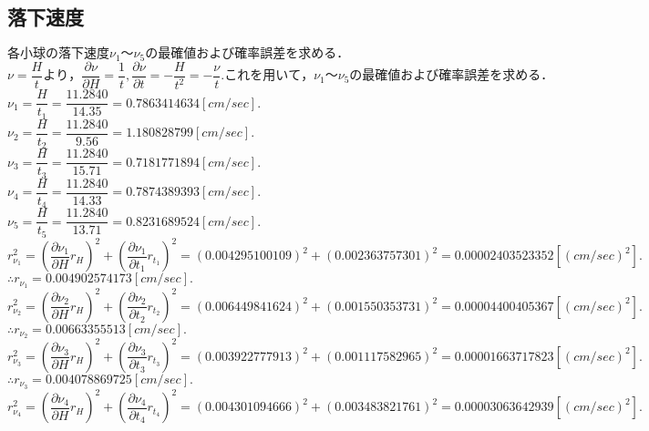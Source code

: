 \documentclass[a4paper,1pt]{jsarticle}
\begin{document}
\subsection*{落下速度}
$各小球の落下速度\nu _1〜\nu _5の最確値および確率誤差を求める．$\\

$\nu =\dfrac{H}{t}より，\dfrac{\partial \nu }{\partial H}=\dfrac{1}{t},\dfrac{\partial \nu }{\partial t}=-\dfrac{H}{t^2}=-\dfrac{\nu }{t}.これを用いて，\nu _1〜\nu _5の最確値および確率誤差を求める．$\\

$\nu _1=\dfrac{H}{t_1}=\dfrac{11.2840}{14.35}=0.7863414634[cm/sec].$\\

$\nu _2=\dfrac{H}{t_2}=\dfrac{11.2840}{9.56}=1.180828799[cm/sec].$\\

$\nu _3=\dfrac{H}{t_3}=\dfrac{11.2840}{15.71}=0.7181771894[cm/sec].$\\

$\nu _4=\dfrac{H}{t_4}=\dfrac{11.2840}{14.33}=0.7874389393[cm/sec].$\\

$\nu _5=\dfrac{H}{t_5}=\dfrac{11.2840}{13.71}=0.8231689524[cm/sec].$\\

$r_{\nu _1}^2=(\dfrac{\partial \nu _1}{\partial H}r_H)^2+(\dfrac{\partial \nu _1}{\partial t_1}r_{t_1})^2=(0.004295100109)^2+(0.002363757301)^2=0.00002403523352[(cm/sec)^2].$\\

$\therefore r_{\nu _1}=0.004902574173[cm/sec].$\\

$r_{\nu _2}^2=(\dfrac{\partial \nu _2}{\partial H}r_H)^2+(\dfrac{\partial \nu _2}{\partial t_2}r_{t_2})^2=(0.006449841624)^2+(0.001550353731)^2=0.00004400405367[(cm/sec)^2].$\\

$\therefore r_{\nu _2}=0.00663355513[cm/sec].$\\

$r_{\nu _3}^2=(\dfrac{\partial \nu _3}{\partial H}r_H)^2+(\dfrac{\partial \nu _3}{\partial t_3}r_{t_3})^2=(0.003922777913)^2+(0.001117582965)^2=0.00001663717823[(cm/sec)^2].$\\

$\therefore r_{\nu _3}=0.004078869725[cm/sec].$\\

$r_{\nu _4}^2=(\dfrac{\partial \nu _4}{\partial H}r_H)^2+(\dfrac{\partial \nu _4}{\partial t_4}r_{t_4})^2=(0.004301094666)^2+(0.003483821761)^2=0.00003063642939[(cm/sec)^2].$\\
\end{document}
